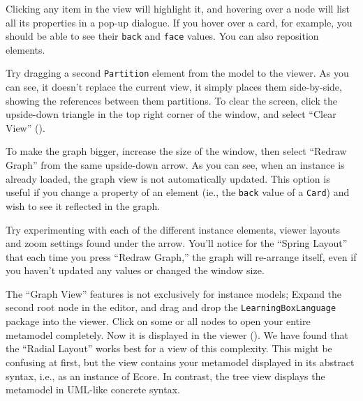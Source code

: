 \begin{stepbystep}
\vspace{0.5cm}

\item Clicking any item in the view will highlight it, and hovering over a node will list all its properties in a pop-up dialogue. If you
hover over a card, for example, you should be able to see their \texttt{back} and \texttt{face} values. You can also reposition elements.

\clearpage

\item Try dragging a second \texttt{Partition} element from the model to the viewer. As you can see, it doesn't replace the current
view, it simply places them side-by-side, showing the references between them partitions. To clear the screen, click the upside-down triangle in the top
right corner of the window, and select ``Clear View'' ().

\item To make the graph bigger, increase the size of the window, then select ``Redraw Graph'' from the same upside-down arrow. As you can
see, when an instance is already loaded, the graph view is not automatically updated. This option is useful if you change a property of an element (ie., the
\texttt{back} value of a \texttt{Card}) and wish to see it reflected in the graph.

\item Try experimenting with each of the different instance elements, viewer layouts and zoom settings found under the arrow. You'll
notice for the ``Spring Layout'' that each time you press ``Redraw Graph,'' the graph will re-arrange itself, even if you haven't updated any values or changed the window size.

\item The ``Graph View'' features is not exclusively for instance models; Expand the second root node in the editor, and drag and
drop the \texttt{Learn\-ing\-Box\-Language} package into the viewer. Click on some or all nodes to open your entire metamodel completely. Now it is displayed in the viewer
(). We have found that the ``Radial Layout'' works best for a view of this complexity. This might be confusing at first,
but the view contains your metamodel displayed in its abstract syntax, i.e., as an instance of Ecore. In contrast, the tree view displays the metamodel in UML-like
concrete syntax.

\vspace{1cm}


\end{stepbystep}
